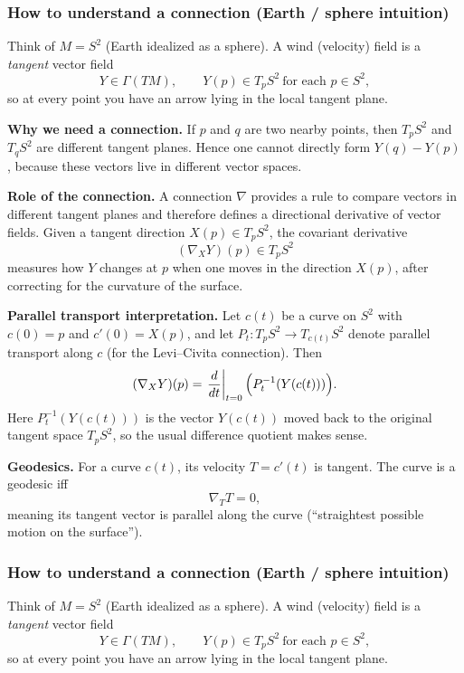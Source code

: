 \documentclass[12pt,a4paper]{article}
\theoremstyle{plain}
\theoremstyle{definition}      %
\begin{document}
	\subsubsection*{How to understand a connection (Earth / sphere intuition)}
	
	Think of $M=S^2$ (Earth idealized as a sphere). A wind (velocity) field is a \emph{tangent} vector field
	\[
	Y\in \Gamma(TM),\qquad Y(p)\in T_pS^2\ \text{for each }p\in S^2,
	\]
	so at every point you have an arrow lying in the local tangent plane.
	
	\medskip
	\noindent
	\textbf{Why we need a connection.}
	If $p$ and $q$ are two nearby points, then $T_pS^2$ and $T_qS^2$ are different tangent planes. Hence one cannot
	directly form $Y(q)-Y(p)$, because these vectors live in different vector spaces.
	
	\medskip
	\noindent
	\textbf{Role of the connection.}
	A connection $\nabla$ provides a rule to compare vectors in different tangent planes and therefore defines a
	directional derivative of vector fields. Given a tangent direction $X(p)\in T_pS^2$, the covariant derivative
	\[
	(\nabla_XY)(p)\in T_pS^2
	\]
	measures how $Y$ changes at $p$ when one moves in the direction $X(p)$, after correcting for the curvature of the
	surface.
	
	\medskip
	\noindent
	\textbf{Parallel transport interpretation.}
	Let $c(t)$ be a curve on $S^2$ with $c(0)=p$ and $c'(0)=X(p)$, and let
	$P_t:T_pS^2\to T_{c(t)}S^2$ denote parallel transport along $c$ (for the Levi--Civita connection).
	Then
	\[
	(\nabla_XY)(p)
	=
	\left.\frac{d}{dt}\right|_{t=0}\Bigl(P_t^{-1}(Y(c(t)))\Bigr).
	\]
	Here $P_t^{-1}(Y(c(t)))$ is the vector $Y(c(t))$ moved back to the original tangent space $T_pS^2$, so the usual
	difference quotient makes sense.
	
	\medskip
	\noindent
	\textbf{Geodesics.}
	For a curve $c(t)$, its velocity $T=c'(t)$ is tangent. The curve is a geodesic iff
	\[
	\nabla_TT=0,
	\]
	meaning its tangent vector is parallel along the curve (``straightest possible motion on the surface'').
	
	\subsubsection*{How to understand a connection (Earth / sphere intuition)}
	
	Think of $M=S^2$ (Earth idealized as a sphere). A wind (velocity) field is a \emph{tangent} vector field
	\[
	Y\in \Gamma(TM),\qquad Y(p)\in T_pS^2\ \text{for each }p\in S^2,
	\]
	so at every point you have an arrow lying in the local tangent plane.
	
\end{document}
